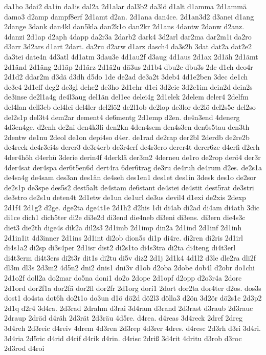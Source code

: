 {da1ho
3dai2
da1in
da1is
dal2a
2d1alar
dal3b2
da3lö
d1alt
d1amma
2d1ammä
damo3
d2amp
dampf8erf
2d1amt
d2an.
2d1ana
dan4ce.
2d1an3d2
d3anei
d1ang
2dange
3dank
dan4kl
dan5kla
dan2k1o
dan2kr
2d1ans
4dantw
2danw
d2anz.
4danzi
2d1ap
d2aph
4dapp
da2r3a
2darb2
dark4
3d2arl
dar2ma
dar2m1i
da2ro
d3arr
3d2ars
d1art
2dart.
da2ru
d2arw
d1arz
dasch4
da3s2h
3dat
dat2a
dat2e2
da3tei
date4n
4d3atl
4d1atm
3dau3e
4d1au2f
d3aug
4d1aus
2d1ax
2d1äh
2d1ämt
2d1änd
2d1äng
2d1äp
2d1ärz
2d1ä2u
dä3us
2d1b4
dbu2c
dbu3s
2dc
d1ch
dco4r
2d1d2
ddar2m
d3dä
d3dh
d5do
1de
de2ad
de3a2t
3deb4
4d1e2ben
3dec
de1ch
de3e4
2d1eff
deg2
de3gl
dehe2
de3ho
2d1ehr
d1ei
3d2eic
3d2e1im
dein2d
dein2s
de3inse
de2l1a4g
de4l3aug
del1än
del1ec
delei4g
2d1elek
2delem
deler4
2delfm
del4lan
dell3eb
del4lei
del4ler
del2lö2
de2l1ob
de2lop
de3lor
de2lö
del2s5e
del2so
del2s1p
del3t4
dem2ar
dement4
de6mentg
2d1emp
d2en.
de4n3end
4denerg
4d3en4ge.
d2enh
de2ni
den4k3li
den2kn
4den4sem
den4s3en
den6s5tau
den3th
2dentw
de1nu
2deol
de1on
depi4so
d4er.
de1rad
de2rap
der2bl
2derdb
de2re2b
de4reck
de4r3ei4s
derer3
de3r4erb
de3r4erf
de4r3ero
derer4t
derer6ze
d4erfi
d2erh
4der4höh
d4erhü
3derie
derin4f
4derklä
der3m2
4derneu
de1ro
de2rop
derö4
der3r
4der4sat
der4spa
der6t5en6d
dert4ra
6der6trag
de3ru
de4ruh
de4rum
d2es.
de2s1a
de4sa4g
de4sam
des3an
des1än
de4seh
des1en1
des1et
des1in
3desk
des1o
de2sor
de2s1p
de3spe
des5s2
dest5alt
de4stam
de6stant
de4stei
de4stit
dest5rat
de3stri
de3stro
de2s1u
deten4t
2d1etw
de1un
de1url
de3us
devil4
d1exi
de2xis
2dexp
2d1f4
2d1g2
d2ge.
dge2ta
dge4t1e
2d1h2
d2his
1di
di4ab
di2ad
di4am
di4ath
3dic
di1ce
dich1
dich5ter
di2e
di3e2d
di3end
die4neb
di3eni
di3ens.
di3ern
die4s3c
diet3
die2th
dige4s
dik2a
dil2s3
2d1imb
2d1imp
din2a
2d1ind
2d1inf
2d1inh
2d1in1it
4d3inner
2d1ins
2d1int
di2ob
dion5s
di1p
di4re.
di2ren
di2ris
2d1irl
di4s1a2
di2sp
di3s4per
2d1isr
dist2
di2s1to
di4s3tra
di2ta
di4teng
di4t3erl
di4t3erm
di4t3ers
di2t3r
dit1s
di2tu
di5v
diz2
2d1j
2d1k4
4d1l2
d3le
dle2ra
dli2f
dl3m
dl3s
2d3m2
4d5n2
dni2
dnis1
dni3v
d1ob
d2oba
2dobe
dob4l
d2obr
do1chi
2d1o2f
doll2a
do2mar
do5na
doni1
do2o
2dope
2d1opf
d2opp
d2o3r4a
2dorc
2d1ord
dor2f1a
dor2fä
dor2fl
dor2fr
2d1org
dori1
2dort
dor2ta
dor4ter
d2os.
dos3s
dost1
do4sta
dot6h
do2t1o
do3un
d1ö
dö2d
dö2l3
dölla3
d2ön
3d2ör
dö2s1c
2d3p2
2d1q
d2r4
3d4ra.
2d3rad
2drahm
d3rai
3d4ram
d3rand
2d3rast
d3raub
2d3rauc
2draup
2dräd
d4räh
2d3rät
2d3räu
4d5re.
d4rea.
d4reas
3d4reck
2dref
2dreg
3d4reh
2d3reic
d4reiv
4drem
4d3ren
2d3rep
4d3rer
4dres.
d4resc
2d3rh
d3ri
3d4ri.
3d4ria
2d5ric
d4rid
d4rif
d4rik
d4rin.
d4risc
2driß
3d4rit
4dritu
d3rob
d3roc
2d3rod
d4roi
}
